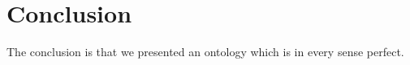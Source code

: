 \section{Conclusion}

\color{red}
The conclusion is that we presented an ontology which is in every sense perfect.

\color{black}
